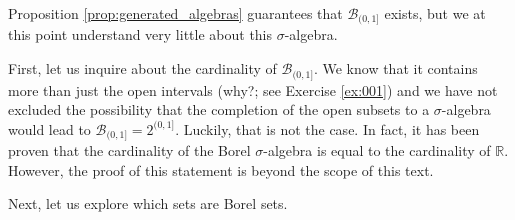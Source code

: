\documentclass{book}
\theoremstyle{plain}%
\theoremstyle{definition}
\begin{document}
Proposition \ref{prop:generated_algebras} guarantees that $\mathcal{B}_{(0,1]}$ exists, but we at this point understand very little about this $\sigma$-algebra.

First, let us inquire about the cardinality of $\mathcal{B}_{(0,1]}$. We know that it contains more than just the open intervals (why?; see Exercise \ref{ex:001}) and we have not excluded the possibility that the completion of the open subsets to a $\sigma$-algebra would lead to $\mathcal{B}_{(0,1]} = 2^{(0,1]}$. Luckily, that is not the case. In fact, it has been proven that the cardinality of the Borel $\sigma$-algebra is equal to the cardinality of $\mathbb{R}$. However, the proof of this statement is beyond the scope of this text.

Next, let us explore which sets are Borel sets. 
\end{document}
